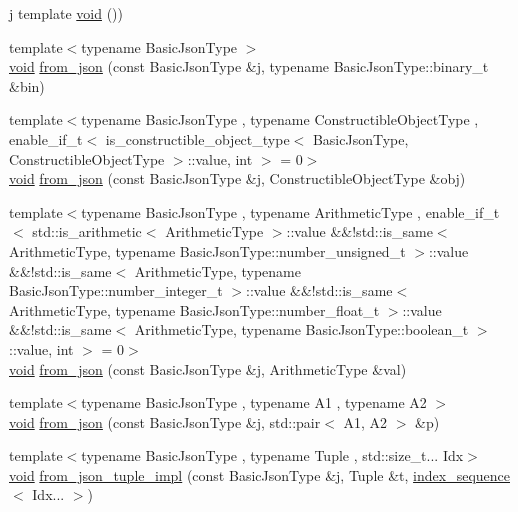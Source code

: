 \begin{DoxyCompactItemize}
\item 
j template \hyperlink{namespacenlohmann_1_1detail_a59fca69799f6b9e366710cb9043aa77d}{void} ())
\item 
{\footnotesize template$<$typename Basic\+Json\+Type $>$ }\\\hyperlink{namespacenlohmann_1_1detail_a59fca69799f6b9e366710cb9043aa77d}{void} \hyperlink{namespacenlohmann_1_1detail_aeabc1adfeb8bcfbdf24c533380d1e773}{from\+\_\+json} (const Basic\+Json\+Type \&j, typename Basic\+Json\+Type\+::binary\+\_\+t \&bin)
\item 
{\footnotesize template$<$typename Basic\+Json\+Type , typename Constructible\+Object\+Type , enable\+\_\+if\+\_\+t$<$ is\+\_\+constructible\+\_\+object\+\_\+type$<$ Basic\+Json\+Type, Constructible\+Object\+Type $>$\+::value, int $>$  = 0$>$ }\\\hyperlink{namespacenlohmann_1_1detail_a59fca69799f6b9e366710cb9043aa77d}{void} \hyperlink{namespacenlohmann_1_1detail_a5b24896e5f5db6af06d939dde4b63fe1}{from\+\_\+json} (const Basic\+Json\+Type \&j, Constructible\+Object\+Type \&obj)
\item 
{\footnotesize template$<$typename Basic\+Json\+Type , typename Arithmetic\+Type , enable\+\_\+if\+\_\+t$<$ std\+::is\+\_\+arithmetic$<$ Arithmetic\+Type $>$\+::value \&\&!std\+::is\+\_\+same$<$ Arithmetic\+Type, typename Basic\+Json\+Type\+::number\+\_\+unsigned\+\_\+t $>$\+::value \&\&!std\+::is\+\_\+same$<$ Arithmetic\+Type, typename Basic\+Json\+Type\+::number\+\_\+integer\+\_\+t $>$\+::value \&\&!std\+::is\+\_\+same$<$ Arithmetic\+Type, typename Basic\+Json\+Type\+::number\+\_\+float\+\_\+t $>$\+::value \&\&!std\+::is\+\_\+same$<$ Arithmetic\+Type, typename Basic\+Json\+Type\+::boolean\+\_\+t $>$\+::value, int $>$  = 0$>$ }\\\hyperlink{namespacenlohmann_1_1detail_a59fca69799f6b9e366710cb9043aa77d}{void} \hyperlink{namespacenlohmann_1_1detail_a839b0ab50d2c9bce669068f56bc41202}{from\+\_\+json} (const Basic\+Json\+Type \&j, Arithmetic\+Type \&val)
\item 
{\footnotesize template$<$typename Basic\+Json\+Type , typename A1 , typename A2 $>$ }\\\hyperlink{namespacenlohmann_1_1detail_a59fca69799f6b9e366710cb9043aa77d}{void} \hyperlink{namespacenlohmann_1_1detail_aae9f9c2601074e323d49428132cc293d}{from\+\_\+json} (const Basic\+Json\+Type \&j, std\+::pair$<$ A1, A2 $>$ \&p)
\item 
{\footnotesize template$<$typename Basic\+Json\+Type , typename Tuple , std\+::size\+\_\+t... Idx$>$ }\\\hyperlink{namespacenlohmann_1_1detail_a59fca69799f6b9e366710cb9043aa77d}{void} \hyperlink{namespacenlohmann_1_1detail_a28253915d9db4a0112d60eaee0422949}{from\+\_\+json\+\_\+tuple\+\_\+impl} (const Basic\+Json\+Type \&j, Tuple \&t, \hyperlink{structnlohmann_1_1detail_1_1index__sequence}{index\+\_\+sequence}$<$ Idx... $>$)

\end{DoxyCompactItemize}
